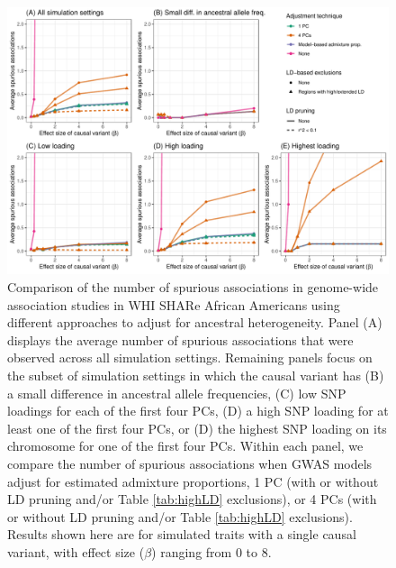 \documentclass[12pt]{article}
\begin{document}
\begin{figure}
\includegraphics[width=\textwidth]{figs/finalfigs/fig5_spurious_allbeta}
\caption{Comparison of the number of spurious associations in genome-wide association studies in WHI SHARe African Americans using different approaches to adjust for ancestral heterogeneity. Panel (A) displays the average number of spurious associations that were observed across all simulation settings. Remaining panels focus on the subset of simulation settings in which the causal variant has (B) a small difference in ancestral allele frequencies, (C) low SNP loadings for each of the first four PCs, (D) a high SNP loading for at least one of the first four PCs, or (D) the highest SNP loading on its chromosome for one of the first four PCs. Within each panel, we compare the number of spurious associations when GWAS models adjust for estimated admixture proportions, 1 PC (with or without LD pruning and/or Table \ref{tab:highLD} exclusions), or 4 PCs (with or without LD pruning and/or Table \ref{tab:highLD} exclusions). Results shown here are for simulated traits with a single causal variant, with effect size ($\beta$) ranging from 0 to 8.}
\label{fig:spurious}
\end{figure}
\end{document}
